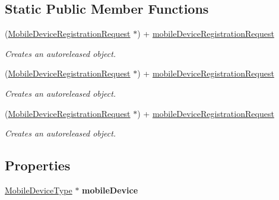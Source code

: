 \subsection*{Static Public Member Functions}
\begin{DoxyCompactItemize}
\item 
(\hyperlink{interface_mobile_device_registration_request}{MobileDeviceRegistrationRequest} $\ast$) + \hyperlink{interface_mobile_device_registration_request_aef29eec5bb96dad9bf28734bcaa9be80}{mobileDeviceRegistrationRequest}
\begin{DoxyCompactList}\small\item\em Creates an autoreleased object. \item\end{DoxyCompactList}\item 
(\hyperlink{interface_mobile_device_registration_request}{MobileDeviceRegistrationRequest} $\ast$) + \hyperlink{interface_mobile_device_registration_request_aef29eec5bb96dad9bf28734bcaa9be80}{mobileDeviceRegistrationRequest}
\begin{DoxyCompactList}\small\item\em Creates an autoreleased object. \item\end{DoxyCompactList}\item 
(\hyperlink{interface_mobile_device_registration_request}{MobileDeviceRegistrationRequest} $\ast$) + \hyperlink{interface_mobile_device_registration_request_aef29eec5bb96dad9bf28734bcaa9be80}{mobileDeviceRegistrationRequest}
\begin{DoxyCompactList}\small\item\em Creates an autoreleased object. \item\end{DoxyCompactList}\end{DoxyCompactItemize}
\subsection*{Properties}
\begin{DoxyCompactItemize}
\item 
\hypertarget{interface_mobile_device_registration_request_a711448fbd76b9898e30ffce48680bcf6}{
\hyperlink{interface_mobile_device_type}{MobileDeviceType} $\ast$ {\bfseries mobileDevice}}
\label{interface_mobile_device_registration_request_a711448fbd76b9898e30ffce48680bcf6}

\end{DoxyCompactItemize}


